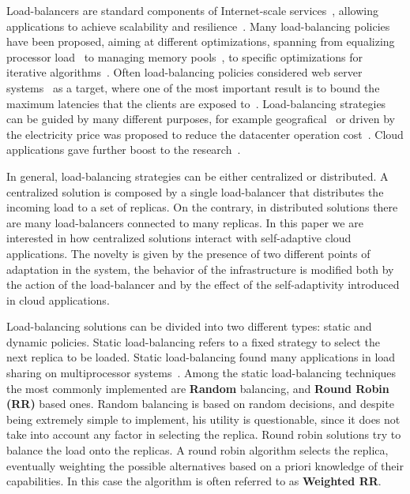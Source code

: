 Load-balancers are standard components of Internet-scale
services~\cite{WangOSDI}, allowing applications to achieve scalability
and resilience~\citep{Barroso09, Hamilton07:LISA,
  clusteredbalancing}. Many load-balancing policies have been
proposed, aiming at different optimizations, spanning from equalizing
processor load~\cite{Stankovic:TC} to managing memory
pools~\cite{PattersonMemoryLB,MemoryLBACC}, to specific optimizations
for iterative algorithms~\cite{BahiIterative}. Often load-balancing
policies considered web server systems~\cite{CLB,Cardellini2003} as a
target, where one of the most important result is to bound the maximum
latencies that the clients are exposed
to~\cite{TC-Abdelzaher}. Load-balancing strategies can be guided by
many different purposes, for example
geografical~\cite{GeograficalSASO,geographicalwanbalancing} or driven
by the electricity price was proposed to reduce the datacenter
operation cost~\cite{LoadBalancingForElectricity:TCC}. Cloud
applications gave further boost to the
research~\citep{Barroso09,Lu11:PerfEval,Lin12:IGCC}.

In general, load-balancing strategies can be either centralized or
distributed. A centralized solution is composed by a single
load-balancer that distributes the incoming load to a set of
replicas. On the contrary, in distributed solutions there are many
load-balancers connected to many replicas. In this paper we are
interested in how centralized solutions interact with self-adaptive
cloud applications. The novelty is given by the presence of two
different points of adaptation in the system, the behavior of the
infrastructure is modified both by the action of the load-balancer and
by the effect of the self-adaptivity introduced in cloud applications.

Load-balancing solutions can be divided into two different types:
static and dynamic policies. Static load-balancing refers to a fixed
strategy to select the next replica to be loaded. Static
load-balancing found many applications in load sharing on
multiprocessor
systems~\cite{StaticLoadBalancing:TSE,StaticOptimal:ACM}. Among the
static load-balancing techniques the most commonly implemented are
\textbf{Random} balancing, and \textbf{Round Robin (RR)} based
ones. Random balancing is based on random decisions, and despite being
extremely simple to implement, his utility is questionable, since it
does not take into account any factor in selecting the replica. Round
robin solutions try to balance the load onto the replicas. A round
robin algorithm selects the replica, eventually weighting the possible
alternatives based on a priori knowledge of their capabilities. In
this case the algorithm is often referred to as \textbf{Weighted RR}.

